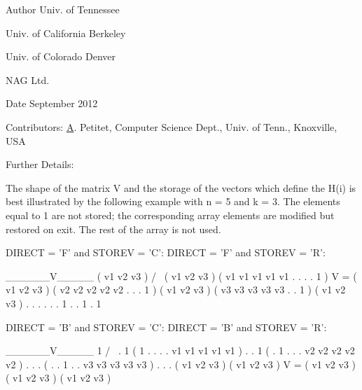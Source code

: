 \begin{DoxyAuthor}{Author}
Univ. of Tennessee 

Univ. of California Berkeley 

Univ. of Colorado Denver 

N\+A\+G Ltd. 
\end{DoxyAuthor}
\begin{DoxyDate}{Date}
September 2012 
\end{DoxyDate}
\begin{DoxyParagraph}{Contributors\+: }
\hyperlink{classA}{A}. Petitet, Computer Science Dept., Univ. of Tenn., Knoxville, U\+S\+A 
\end{DoxyParagraph}
\begin{DoxyParagraph}{Further Details\+: }
\begin{DoxyVerb}  The shape of the matrix V and the storage of the vectors which define
  the H(i) is best illustrated by the following example with n = 5 and
  k = 3. The elements equal to 1 are not stored; the corresponding
  array elements are modified but restored on exit. The rest of the
  array is not used.

  DIRECT = 'F' and STOREV = 'C':         DIRECT = 'F' and STOREV = 'R':

                                              ______V_____
         ( v1 v2 v3 )                        /            \
         ( v1 v2 v3 )                      ( v1 v1 v1 v1 v1 . . . . 1 )
     V = ( v1 v2 v3 )                      ( v2 v2 v2 v2 v2 . . . 1   )
         ( v1 v2 v3 )                      ( v3 v3 v3 v3 v3 . . 1     )
         ( v1 v2 v3 )
            .  .  .
            .  .  .
            1  .  .
               1  .
                  1

  DIRECT = 'B' and STOREV = 'C':         DIRECT = 'B' and STOREV = 'R':

                                                        ______V_____
            1                                          /            \
            .  1                           ( 1 . . . . v1 v1 v1 v1 v1 )
            .  .  1                        ( . 1 . . . v2 v2 v2 v2 v2 )
            .  .  .                        ( . . 1 . . v3 v3 v3 v3 v3 )
            .  .  .
         ( v1 v2 v3 )
         ( v1 v2 v3 )
     V = ( v1 v2 v3 )
         ( v1 v2 v3 )
         ( v1 v2 v3 )\end{DoxyVerb}
 
\end{DoxyParagraph}
